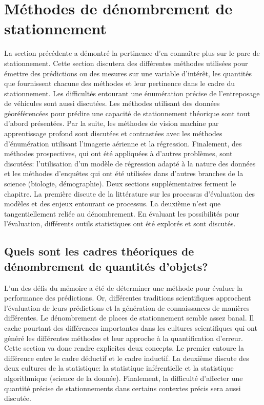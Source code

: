 \section{Méthodes de dénombrement de stationnement}\label{sec:revue-meth-inventaire}
    La section précédente a démontré la pertinence d'en connaître plus sur le parc de stationnement. Cette section discutera des différentes méthodes utilisées pour émettre des prédictions ou des mesures sur une variable d'intérêt, les quantités que fournissent chacune des méthodes et leur pertinence dans le cadre du stationnement. Les difficultés entourant une énumération précise de l'entreposage de véhicules sont aussi discutées. Les méthodes utilisant des données géoréférencées pour prédire une capacité de stationnement théorique sont tout d'abord présentées. Par la suite, les méthodes de vision machine par apprentissage profond sont discutées et contrastées avec les méthodes d'énumération utilisant l'imagerie aérienne et la régression. Finalement, des méthodes prospectives, qui ont été appliquées à d'autres problèmes, sont discutées: l'utilisation d'un modèle de régression adapté à la nature des données et les méthodes d'enquêtes qui ont été utilisées dans d'autres branches de la science (biologie, démographie). Deux sections supplémentaires ferment le chapitre. La première discute de la littérature sur les processus d'évaluation des modèles et des enjeux entourant ce processus. La deuxième n'est que tangentiellement reliée au dénombrement. En évaluant les possibilités pour l'évaluation, différents outils statistiques ont été explorés et sont discutés.
    \subsection{Quels sont les cadres théoriques de dénombrement de quantités d'objets?}
        L'un des défis du mémoire a été de déterminer une méthode pour évaluer la performance des prédictions. Or, différentes traditions scientifiques approchent l'évaluation de leurs prédictions et la génération de connaissances de manières différentes. Le dénombrement de places de stationnement semble assez banal. Il cache pourtant des différences importantes dans les cultures scientifiques qui ont généré les différentes méthodes et leur approche à la quantification d'erreur. Cette section va donc rendre explicites deux concepts. Le premier entoure la différence entre le cadre déductif et le cadre inductif. La deuxième discute des deux cultures de la statistique: la statistique inférentielle et la statistique algorithmique (science de la donnée). Finalement, la difficulté d'affecter une quantité précise de stationnements dans certains contextes précis sera aussi discutée.
